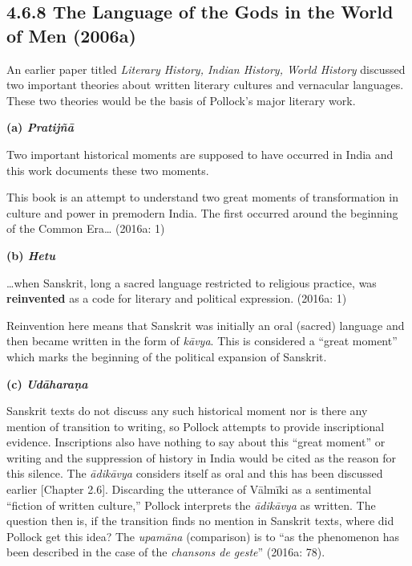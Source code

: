 \subsection*{4.6.8 The Language of the Gods in the World of Men (2006a)}

\vspace{-.3cm}

An earlier paper titled \textit{Literary History, Indian History, World History }discussed two important theories about written literary cultures and vernacular languages. These two theories would be the basis of Pollock’s major literary work.

\textbf{(a) \textit{Pratijñā }}

Two important historical moments are supposed to have occurred in India and this work documents these two moments.

\begin{myquote}
This book is an attempt to understand two great moments of transformation in culture and power in premodern India. The ﬁrst occurred around the beginning of the Common Era… (2016a: 1)
\end{myquote}

\textbf{(b) \textit{Hetu}}

\begin{myquote}
…when Sanskrit, long a sacred language restricted to religious practice, was \textbf{reinvented} as a code for literary and political expression. (2016a: 1)
\end{myquote}

Reinvention here means that Sanskrit was initially an oral (sacred) language and then became written in the form of \textit{kāvya}. This is considered a “great moment” which marks the beginning of the political expansion of Sanskrit.

\textbf{(c) \textit{Udāharaṇa}}

Sanskrit texts do not discuss any such historical moment nor is there any mention of transition to writing, so Pollock attempts to provide inscriptional evidence. Inscriptions also have nothing to say about this “great moment” or writing and the suppression of history in India would be cited as the reason for this silence. The \textit{ādikāvya }considers itself as oral and this has been discussed earlier [Chapter 2.6]. Discarding the utterance of Vālmīki as a sentimental “ﬁction of written culture,” Pollock interprets the \textit{ādikāvya }as written. The question then is, if the transition finds no mention in Sanskrit texts, where did Pollock get this idea? The \textit{upamāna} (comparison) is to “as the phenomenon has been described in the case of the \textit{chansons de geste}” (2016a: 78).

